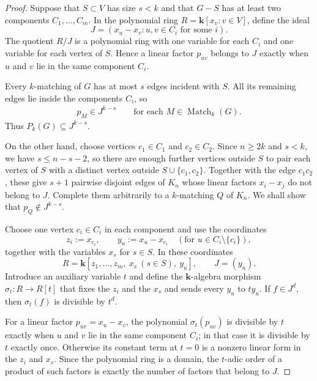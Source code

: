 \documentclass[12pt]{amsart}
\theoremstyle{definition}
\theoremstyle{remark}
\newcommand{\kk}{\mathbf{k}}
\newcommand{\Match}{\operatorname{Match}}
\begin{document}
\begin{proof}
Suppose that $S\subset V$ has size $s<k$ and that $G-S$ has at least two
components $C_1,\ldots,C_m$.  In the polynomial ring $R=\kk[x_v:v\in V]$,
define the ideal
\[
 J=(x_u-x_v:u,v\in C_i\text{ for some }i).
\]
The quotient $R/J$ is a polynomial ring with one variable for each $C_i$ and
one variable for each vertex of $S$.  Hence a linear factor $p_{uv}$ belongs
to $J$ exactly when $u$ and $v$ lie in the same component $C_i$.

Every $k$-matching of $G$ has at most $s$ edges incident with $S$.  All its
remaining edges lie inside the components $C_i$, so
\begin{align}
 p_M\in J^{k-s}
 \qquad \text{for each }M\in\Match_k(G).
 \label{pf:prop:k-connected:pMin}
\end{align}
Thus $P_k(G)\subseteq J^{k-s}$.

On the other hand, choose vertices $c_1\in C_1$ and $c_2\in C_2$.  Since
$n\geq2k$ and $s<k$, we have $s\leq n-s-2$, so
there are enough further vertices outside $S$ to pair
each vertex of $S$ with a distinct vertex outside
$S\cup\{c_1,c_2\}$.  Together with the edge $c_1c_2$, these give $s+1$
pairwise disjoint edges of $K_n$ whose linear factors $x_i - x_j$
do not belong to $J$.
Complete them arbitrarily to a $k$-matching $Q$ of $K_n$.
We shall show that $p_Q \notin J^{k-s}$.

Choose one vertex $c_i\in C_i$ in each component and use the coordinates
\[
 z_i:=x_{c_i},\qquad
 y_u:=x_u-x_{c_i}\quad(\text{for } u\in C_i\setminus\{c_i\}),
\]
together with the variables $x_s$ for $s\in S$.  In these coordinates
\[
 R=\kk[z_1,\ldots,z_m,\ x_s\ (s\in S),\ y_u],
 \qquad
 J=(y_u).
\]
Introduce an auxiliary variable $t$ and define the $\kk$-algebra morphism
$\sigma_t:R\to R[t]$ that fixes the $z_i$ and the $x_s$ and sends every
$y_u$ to $t y_u$.  If $f\in J^d$, then $\sigma_t(f)$ is divisible by $t^d$.

For a linear factor $p_{uv}=x_u-x_v$, the polynomial
$\sigma_t(p_{uv})$ is divisible by $t$ exactly when $u$ and $v$ lie in the
same component $C_i$; in that case it is divisible by $t$ exactly once.
Otherwise its constant term at $t=0$ is a nonzero linear form in the
$z_i$ and $x_s$.  Since the polynomial ring is a domain, the $t$-adic order
of a product of such factors is exactly the number of factors that
belong to $J$.


\end{proof}
\end{document}
